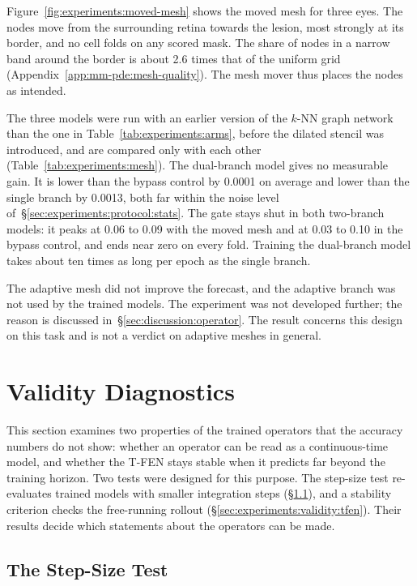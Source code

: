Figure~\ref{fig:experiments:moved-mesh} shows the moved mesh for three
eyes. The nodes move from the surrounding retina towards the lesion, most
strongly at its border, and no cell folds on any scored mask. The share of
nodes in a narrow band around the border is about 2.6 times that of the
uniform grid (Appendix~\ref{app:mm-pde:mesh-quality}). The mesh mover thus
places the nodes as intended.

The three models were run with an earlier version of the $k$-NN graph
network than the one in Table~\ref{tab:experiments:arms}, before the
dilated stencil was introduced, and are compared only with each other
(Table~\ref{tab:experiments:mesh}). The dual-branch model gives no
measurable gain. It is lower than the bypass control by 0.0001 on average
and lower than the single branch by 0.0013, both far within the noise
level of~\S\ref{sec:experiments:protocol:stats}. The gate stays shut in
both two-branch models: it peaks at 0.06 to 0.09 with the moved mesh and at
0.03 to 0.10 in the bypass control, and ends near zero on every fold.
Training the dual-branch model takes about ten times as long per epoch as
the single branch.

The adaptive mesh did not improve the forecast, and the adaptive branch
was not used by the trained models. The experiment was not developed
further; the reason is discussed in~\S\ref{sec:discussion:operator}. The
result concerns this design on this task and is not a verdict on adaptive
meshes in general.


\section{Validity Diagnostics}
\label{sec:experiments:validity}

This section examines two properties of the trained operators that the
accuracy numbers do not show: whether an operator can be read as a
continuous-time model, and whether the T-FEN stays stable when it predicts
far beyond the training horizon. Two tests were designed for this purpose.
The step-size test re-evaluates trained models with smaller integration
steps (\S\ref{sec:experiments:validity:swap}), and a stability criterion
checks the free-running rollout (\S\ref{sec:experiments:validity:tfen}).
Their results decide which statements about the operators can be made.

\subsection{The Step-Size Test}
\label{sec:experiments:validity:swap}

